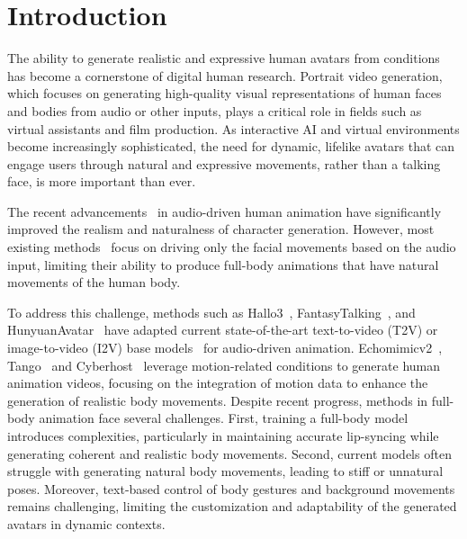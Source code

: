 \section{Introduction}

The ability to generate realistic and expressive human avatars from conditions has become a cornerstone of digital human research. Portrait video generation, which focuses on generating high-quality visual representations of human faces and bodies from audio or other inputs, plays a critical role in fields such as virtual assistants and film production. As interactive AI and virtual environments become increasingly sophisticated, the need for dynamic, lifelike avatars that can engage users through natural and expressive movements, rather than a talking face, is more important than ever. 

The recent advancements~\cite{meng2024echomimicv2,wei2025mocha,chen2025hunyuanvideoavatar,cui2024hallo3,jiang2024loopy,wang2025fantasytalking,lin2025omnihuman} in audio-driven human animation have significantly improved the realism and naturalness of character generation. However, most existing methods~\cite{ji2024sonic,wang2024v,wei2024aniportrait} focus on driving only the facial movements based on the audio input, limiting their ability to produce full-body animations that have natural movements of the human body. 

To address this challenge, methods such as Hallo3~\cite{cui2024hallo3}, FantasyTalking~\cite{wang2025fantasytalking}, and HunyuanAvatar~\cite{chen2025hunyuanvideoavatar} have adapted current state-of-the-art text-to-video (T2V) or image-to-video (I2V) base models~\cite{yang2024cogvideox,wan2025wan,kong2024hunyuanvideo} for audio-driven animation. Echomimicv2~\cite{meng2024echomimicv2}, Tango~\cite{liu2024tango} and Cyberhost~\cite{lin2024cyberhost} leverage motion-related conditions to generate human animation videos, focusing on the integration of motion data to enhance the generation of realistic body movements. Despite recent progress, methods in full-body animation face several challenges. First, training a full-body model introduces complexities, particularly in maintaining accurate lip-syncing while generating coherent and realistic body movements. Second, current models often struggle with generating natural body movements, leading to stiff or unnatural poses. Moreover, text-based control of body gestures and background movements remains challenging, limiting the customization and adaptability of the generated avatars in dynamic contexts.

